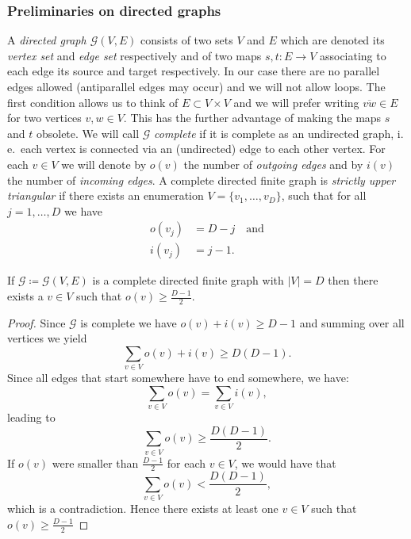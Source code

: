 \subsubsection*{Preliminaries on directed graphs}

\begin{defin}
  A \emph{directed graph \(\mathcal{G}(V,E)\)} consists of two sets \(V\) and \(E\) which are denoted its \emph{vertex set} and \emph{edge set} respectively and of two maps \(s, t \colon E \to V\) associating to each edge its source and target respectively. In our case there are no parallel edges allowed (antiparallel edges may occur) and we will not allow loops. The first condition allows us to think of \(E \subset V \times V\) and we will prefer writing \(\overline{vw} \in E\) for two vertices \(v,w \in V\). This has the further advantage of making the maps \(s\) and \(t\) obsolete. We will call \(\mathcal{G}\) \emph{complete} if it is complete as an undirected graph, i.\,e.\ each vertex is connected via an (undirected) edge to each other vertex. For each \(v \in V\) we will denote by \(o(v)\) the number of \emph{outgoing edges} and by \(i(v)\) the number of \emph{incoming edges}. A complete directed finite graph is \emph{strictly upper triangular} if there exists an enumeration \(V = \{v_1, \dots, v_D\}\), such that for all \(j = 1, \dots, D\) we have
  \begin{align*}
    o(v_j) & = D - j\quad \text{and}\\
    i(v_j) & = j - 1.
  \end{align*}
\end{defin}

\begin{lemma}[{\cite[Lemma~A.6]{MR3509968}}]
  \label{lem:A.6}
  If \(\mathcal{G} \coloneqq \mathcal{G}(V,E)\) is a complete directed finite graph with \(|V| = D\) then there exists a \(v \in V\) such that \(o(v) \geq \frac{D-1}{2}\).
\end{lemma}

\begin{proof}
  Since \(\mathcal{G}\) is complete we have \(o(v) + i(v) \geq D - 1\) and summing over all vertices we yield
  \[
    \sum_{v \in V} o(v) + i(v) \geq D(D-1).
  \]
  Since all edges that start somewhere have to end somewhere, we have:
  \[
    \sum_{v \in V} o(v) = \sum_{v \in V} i(v),
  \]
  leading to
  \[
    \sum_{v \in V} o(v) \geq \frac{D(D-1)}{2}.
  \]
  If \(o(v)\) were smaller than \(\frac{D-1}{2}\) for each \(v \in V\), we would have that
  \[
    \sum_{v \in V} o(v) < \frac{D(D-1)}{2},
  \]
  which is a contradiction. Hence there exists at least one \(v \in V\) such that \(o(v) \geq \frac{D-1}{2}\)
\end{proof}

